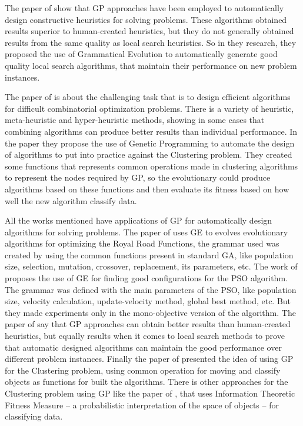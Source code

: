 \documentclass[journal]{IEEEtran}
\begin{document}
	The paper of \cite{burke2012grammatical} show that GP approaches have been employed to automatically design constructive heuristics for solving problems. These algorithms obtained results superior to human-created heuristics, but they do not generally obtained results from the same quality as local search heuristics. So in they research, they proposed the use of Grammatical Evolution to automatically generate good quality local search algorithms, that maintain their performance on new problem instances.
		
	The paper of \cite{bolton2015optimizing} is about the challenging task that is to design efficient algorithms for difficult combinatorial optimization problems. There is a variety of heuristic, meta-heuristic and hyper-heuristic methods, showing in some cases that combining algorithms can produce better results than individual performance. In the paper they propose the use of Genetic Programming to automate the design of algorithms to put into practice against the Clustering problem. They created some functions that represents common operations made in clustering algorithms to represent the nodes required by GP, so the evolutionary could produce algorithms based on these functions and then evaluate its fitness based on how well the new algorithm classify data.
		
	All the works mentioned have applications of GP for automatically design algorithms for solving problems. The paper of \cite{lourencco2012evolving} uses GE to evolves evolutionary algorithms for optimizing the Royal Road Functions, the grammar used was created by using the common functions present in standard GA, like population size, selection, mutation, crossover, replacement, its parameters, etc. The work of \cite{miranda2015gefpso} proposes the use of GE for finding good configurations for the PSO algorithm. The grammar was defined with the main parameters of the PSO, like population size, velocity calculation, update-velocity method, global best method, etc. But they made experiments only in the mono-objective version of the algorithm. The paper of \cite{burke2012grammatical} say that GP approaches can obtain better results than human-created heuristics, but equally results when it comes to local search methods to prove that automatic designed algorithms can maintain the good performance over different problem instances. Finally the paper of \cite{bolton2015optimizing} presented the idea of using GP for the Clustering problem, using common operation for moving and classify objects as functions for built the algorithms. There is other approaches for the Clustering problem using GP like the paper of \cite{boric2007genetic}, that uses Information Theoretic Fitness Measure -- a probabilistic interpretation of the space of objects -- for classifying data.
	
\end{document}
